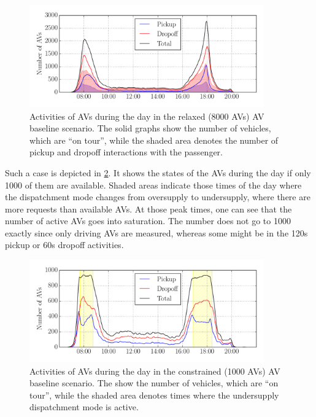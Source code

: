 \begin{figure}
    \centering
    \includegraphics[width=0.9\textwidth]{figures/avwork.pdf}
    \caption{Activities of AVs during the day in the relaxed (8000 AVs) AV baseline scenario.
    The solid graphs show the number of vehicles, which are ``on tour'', while the
    shaded area denotes the number of pickup and dropoff interactions with the
    passenger.}
    \label{fig:avwork}
\end{figure}

Such a case is depicted in \cref{fig:avwork_low}. It shows the states of the AVs during the day
if only 1000 of them are available. Shaded areas
indicate those times of the day where the dispatchment mode changes from
oversupply to undersupply, where there are more requests than available AVs. At those
peak times, one
can see that the number of active AVs goes into saturation. The number does not
go to 1000 exactly since only driving AVs are measured, whereas some might be in
the 120s pickup or 60s dropoff activities.

\begin{figure}
    \centering
    \includegraphics[width=0.9\textwidth]{figures/avwork_low.pdf}
    \caption{Activities of AVs during the day in the constrained (1000 AVs) AV baseline scenario.
    The show the number of vehicles, which are ``on tour'', while the
    shaded area denotes times where the undersupply dispatchment mode is active.}
    \label{fig:avwork_low}
\end{figure}

